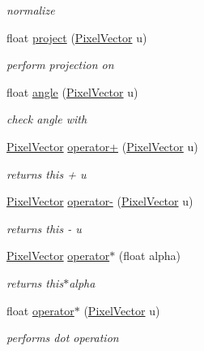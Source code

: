 \begin{DoxyCompactItemize}
\begin{DoxyCompactList}\small\item\em normalize \end{DoxyCompactList}\item 
float \hyperlink{class_pixel_vector_a32846ece3d815954da2ab39d4065e043}{project} (\hyperlink{class_pixel_vector}{\-Pixel\-Vector} u)
\begin{DoxyCompactList}\small\item\em perform projection on \end{DoxyCompactList}\item 
float \hyperlink{class_pixel_vector_a3f6081147fc02cfb70f8126ae3c6cb43}{angle} (\hyperlink{class_pixel_vector}{\-Pixel\-Vector} u)
\begin{DoxyCompactList}\small\item\em check angle with \end{DoxyCompactList}\item 
\hyperlink{class_pixel_vector}{\-Pixel\-Vector} \hyperlink{class_pixel_vector_ab7ec610eb21ba7ccaa06f9c4fc17bfbb}{operator+} (\hyperlink{class_pixel_vector}{\-Pixel\-Vector} u)
\begin{DoxyCompactList}\small\item\em returns this + u \end{DoxyCompactList}\item 
\hyperlink{class_pixel_vector}{\-Pixel\-Vector} \hyperlink{class_pixel_vector_aebbd2da733ec07a11c3bbce5bb022d71}{operator-\/} (\hyperlink{class_pixel_vector}{\-Pixel\-Vector} u)
\begin{DoxyCompactList}\small\item\em returns this -\/ u \end{DoxyCompactList}\item 
\hyperlink{class_pixel_vector}{\-Pixel\-Vector} \hyperlink{class_pixel_vector_a6eaa15e3c61944ed2babf972b057adb9}{operator$\ast$} (float alpha)
\begin{DoxyCompactList}\small\item\em returns this$\ast$alpha \end{DoxyCompactList}\item 
float \hyperlink{class_pixel_vector_a9725ed4d0ff56fda7a31d908854e446c}{operator$\ast$} (\hyperlink{class_pixel_vector}{\-Pixel\-Vector} u)
\begin{DoxyCompactList}\small\item\em performs dot operation \end{DoxyCompactList}\end{DoxyCompactItemize}
